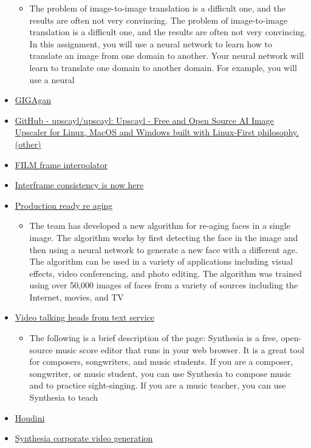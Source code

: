 \begin{itemize}
  \begin{itemize}
  \tightlist
  \item
    The problem of image-to-image translation is a difficult one, and
    the results are often not very convincing. The problem of
    image-to-image translation is a difficult one, and the results are
    often not very convincing. In this assignment, you will use a neural
    network to learn how to translate an image from one domain to
    another. Your neural network will learn to translate one domain to
    another domain. For example, you will use a neural
  \end{itemize}
\item
  \href{https://mingukkang.github.io/GigaGAN/}{GIGAgan}
\item
  \href{https://github.com/upscayl/upscayl}{GitHub - upscayl/upscayl:
  Upscayl - Free and Open Source AI Image Upscaler for Linux, MacOS and
  Windows built with Linux-First philosophy. (other)}
\item
  \href{https://film-net.github.io/}{FILM frame interpolator}
\item
  \href{https://twitter.com/cut_pow/status/1576748659051749377}{Interframe
  consistency is now here}
\item
  \href{https://studios.disneyresearch.com/2022/11/30/production-ready-face-re-aging-for-visual-effects/}{Production
  ready re aging}

  \begin{itemize}
  \tightlist
  \item
    The team has developed a new algorithm for re-aging faces in a
    single image. The algorithm works by first detecting the face in the
    image and then using a neural network to generate a new face with a
    different age. The algorithm can be used in a variety of
    applications including visual effects, video conferencing, and photo
    editing. The algorithm was trained using over 50,000 images of faces
    from a variety of sources including the Internet, movies, and TV
  \end{itemize}
\item
  \href{https://www.synthesia.io/}{Video talking heads from text
  service}

  \begin{itemize}
  \tightlist
  \item
    The following is a brief description of the page: Synthesia is a
    free, open-source music score editor that runs in your web browser.
    It is a great tool for composers, songwriters, and music students.
    If you are a composer, songwriter, or music student, you can use
    Synthesia to compose music and to practice sight-singing. If you are
    a music teacher, you can use Synthesia to teach
  \end{itemize}
\item
  \href{https://github.com/proceduralit/StableDiffusion_Houdini}{Houdini}
\item
  \href{https://www.youtube.com/watch?v=4uzzD9sD-PI}{Synthesia corporate
  video generation}


\end{itemize}
